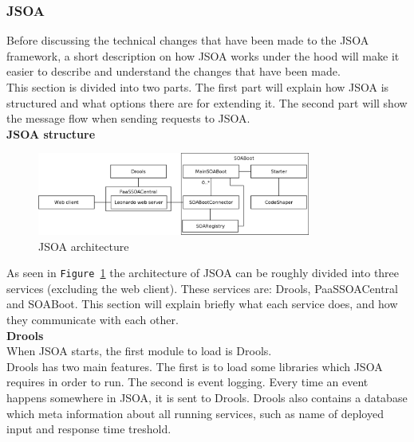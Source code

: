 \documentclass[12pt,a4paper]{article}
\begin{document}
\subsubsection{JSOA}\label{subsec:JSOA}
Before discussing the technical changes that have been made to the JSOA framework, a short description on how JSOA works under the hood will make it easier to describe and understand the changes that have been made.\\
This section is divided into two parts. The first part will explain how JSOA is structured and what options there are for extending it. The second part will show the message flow when sending requests to JSOA.\\

\textbf{JSOA structure} \\
\begin{figure}[h!]
  \centering
    \includegraphics[width=0.8\textwidth]{../figures/jsoa_class_diagram.png}
  \caption{JSOA architecture}
  \label{fig:jsoaArchitecture}
\end{figure}

As seen in \texttt{Figure \ref{fig:jsoaArchitecture}} the architecture of JSOA can be roughly divided into three services (excluding the web client). These services are: Drools, PaaSSOACentral and SOABoot. This section will explain briefly what each service does, and how they communicate with each other. \\

\textbf{Drools} \\
When JSOA starts, the first module to load is Drools. \\
Drools has two main features. The first is to load some libraries which JSOA requires in order to run. The second is event logging. Every time an event happens somewhere in JSOA, it is sent to Drools. Drools also contains a database which meta information about all running services, such as name of deployed input and response time treshold. \\
\end{document}
